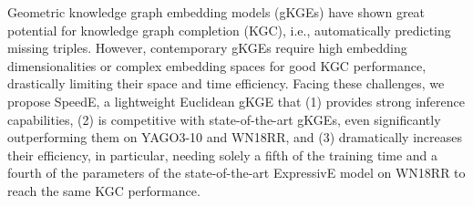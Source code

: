 Geometric knowledge graph embedding models (gKGEs) have shown great potential for knowledge graph completion (KGC), i.e., automatically predicting missing triples. However, contemporary gKGEs require high embedding dimensionalities or complex embedding spaces for good KGC performance, drastically limiting their space and time efficiency. Facing these challenges, we propose SpeedE, a lightweight Euclidean gKGE that (1) provides strong inference capabilities, (2) is competitive with state-of-the-art gKGEs, even significantly outperforming them on YAGO3-10 and WN18RR, and (3) dramatically increases their efficiency, in particular, needing solely a fifth of the training time and a fourth of the parameters of the state-of-the-art ExpressivE model on WN18RR to reach the same KGC performance.